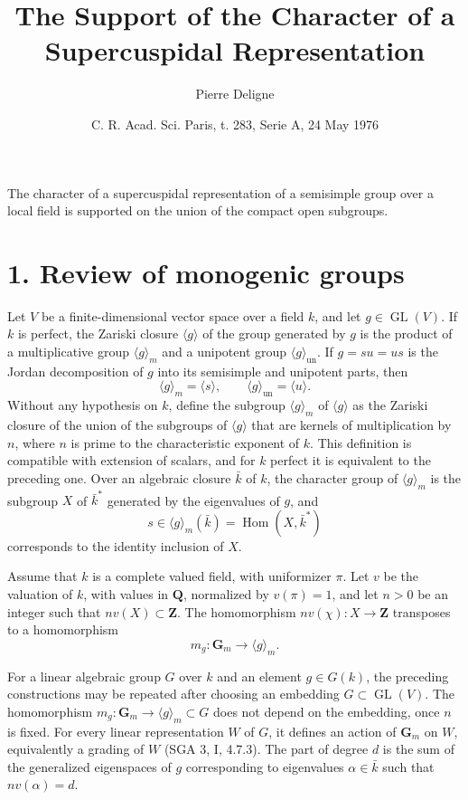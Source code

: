\documentclass[11pt]{amsart}
\theoremstyle{plain}
\theoremstyle{definition}
\theoremstyle{remark}
\DeclareMathOperator{\Hom}{Hom}
\DeclareMathOperator{\GL}{GL}
\newcommand{\Q}{\mathbf{Q}}
\newcommand{\Z}{\mathbf{Z}}
\newcommand{\Gm}{\mathbf{G}_m}
\begin{document}
\title{The Support of the Character of a Supercuspidal Representation}
\author{Pierre Deligne}
\date{C. R. Acad. Sci. Paris, t. 283, Serie A, 24 May 1976}
\maketitle

The character of a supercuspidal representation of a semisimple group over a local field is supported on the union of the compact open subgroups.

\section*{1. Review of monogenic groups}
Let $V$ be a finite-dimensional vector space over a field $k$, and let $g\in\GL(V)$. If $k$ is perfect, the Zariski closure $\langle g\rangle$ of the group generated by $g$ is the product of a multiplicative group $\langle g\rangle_m$ and a unipotent group $\langle g\rangle_{\mathrm{un}}$. If $g=su=us$ is the Jordan decomposition of $g$ into its semisimple and unipotent parts, then
\[
\langle g\rangle_m=\langle s\rangle,\qquad \langle g\rangle_{\mathrm{un}}=\langle u\rangle.
\]
Without any hypothesis on $k$, define the subgroup $\langle g\rangle_m$ of $\langle g\rangle$ as the Zariski closure of the union of the subgroups of $\langle g\rangle$ that are kernels of multiplication by $n$, where $n$ is prime to the characteristic exponent of $k$. This definition is compatible with extension of scalars, and for $k$ perfect it is equivalent to the preceding one. Over an algebraic closure $\bar k$ of $k$, the character group of $\langle g\rangle_m$ is the subgroup $X$ of $\bar k^*$ generated by the eigenvalues of $g$, and
\[
s\in \langle g\rangle_m(\bar k)=\Hom(X,\bar k^*)
\]
corresponds to the identity inclusion of $X$.

Assume that $k$ is a complete valued field, with uniformizer $\pi$. Let $v$ be the valuation of $k$, with values in $\Q$, normalized by $v(\pi)=1$, and let $n>0$ be an integer such that $nv(X)\subset\Z$. The homomorphism $nv(\chi):X\to\Z$ transposes to a homomorphism
\[
m_g:\Gm\to \langle g\rangle_m.
\]

For a linear algebraic group $G$ over $k$ and an element $g\in G(k)$, the preceding constructions may be repeated after choosing an embedding $G\subset\GL(V)$. The homomorphism $m_g:\Gm\to\langle g\rangle_m\subset G$ does not depend on the embedding, once $n$ is fixed. For every linear representation $W$ of $G$, it defines an action of $\Gm$ on $W$, equivalently a grading of $W$ (SGA 3, I, 4.7.3). The part of degree $d$ is the sum of the generalized eigenspaces of $g$ corresponding to eigenvalues $\alpha\in\bar k$ such that $nv(\alpha)=d$.
\end{document}
